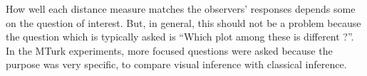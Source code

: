 \documentclass[12]{article}
\newcommand{\red}[1]{{\color{red} #1}}
\newcommand{\green}[1]{{\color{cyan} #1}}
\begin{document}
How well each distance measure matches the observers' responses depends some on the question of interest. But, in general, this should not be a problem because the question which is typically asked is ``Which plot among these is different ?''. In the MTurk experiments, more focused questions were asked because the purpose was very specific, to compare visual inference with classical inference.
%
%
\end{document}
